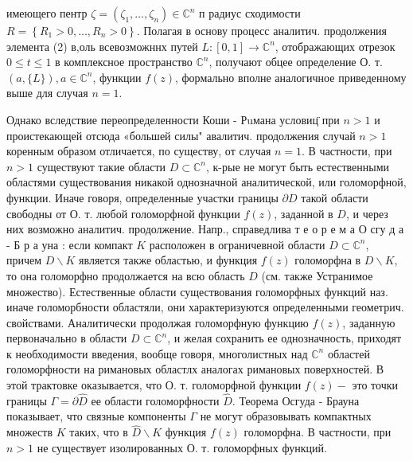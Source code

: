 \documentclass[10pt]{article}
\begin{document}
имеющего пентр $\zeta=\left(\zeta_{1}, \ldots, \zeta_{n}\right) \in \mathbb{C}^{n}$ п радиус сходимости $R=\left\{R_{1}>0, \ldots, R_{n}>0\right\}$. Полагая в основу процесс аналитич. продолжения элемента (2) в,оль всевозможннх путей $L:[0,1] \rightarrow \mathbb{C}^{n}$, отображающих отрезок $0 \leqslant t \leqslant 1$ в комплексное пространство $\mathbb{C}^{n}$, получают обцее определение О. т. $(a,\{L\}), a \in \mathbb{C}^{n}$, функции $f(z)$, формально вполне аналогичное приведенному выше для случая $n=1$.

Однако вследствие переопределенности Коши - Рuмана условиц̈ при $n>1$ и проистекающей отсюда «большей силы" авалитич. продолжения случай $n>1$ коренным образом отличается, по существу, от случая $n=1$. В частности, при $n>1$ существуют такие области $D \subset \mathbb{C}^{n}$, к-рые не могут быть естественными областями существования никакой однозначной аналитической, или голоморфной, функции. Иначе говоря, определенные участки границы $\partial D$ такой области свободны от О. т. любой голоморфной функции $f(z)$, заданной в $D$, и через них возможно аналитич. продолжение. Напр., справедлива т е о р е м а О сгу д а - Б р а уна : если компакт $K$ расположен в ограничевной области $D \subset \mathbb{C}^{n}$, причем $D \backslash K$ является также областью, и функция $f(z)$ голоморфна в $D \backslash K$, то она голоморфно продолжается на всю область $D$ (см. также Устранимое множество). Естественные области существования голоморфных функций наз. иначе голоморбности областяли, они характеризуются определенными геометрич. свойствами. Аналитически продолжая голоморфную функцию $f(z)$, заданную первоначально в области $D \subset \mathbb{C}^{n}$, и желая сохранить ее однозначность, приходят к необходимости введения, вообще говоря, многолистных над $\mathbb{C}^{n}$ областей голоморфности на римановых областлх аналогах римановых поверхностей. В этой трактовке оказывается, что О. т. голоморфной функции $f(z)-$ это точки границы $\Gamma=\partial \hat{D}$ ее области голоморфности $\hat{D}$. Теорема Осгуда - Брауна показывает, что связные компоненты $\Gamma$ не могут образовывать компактных множеств $K$ таких, что в $\hat{D} \backslash K$ функция $f(z)$ голоморфна. В частности, при $n>1$ не существует изолированных О. т. голоморфных функций.
\end{document}
